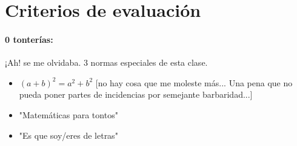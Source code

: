 \documentclass[palatino,nosec]{Docencia}
\begin{document}
\section{Criterios de evaluación}

\paragraph{0 tonterías:} ¡Ah! se me olvidaba. 3 normas especiales de esta clase.

\begin{itemize}
	\item $(a+b)^2 = a^2 + b^2$ [no hay cosa que me moleste más... Una pena que no pueda poner partes de incidencias por semejante barbaridad...]
	\item "Matemáticas para tontos"
	\item "Es que soy/eres de letras"
\end{itemize}



%

%


\printindex
\end{document}
